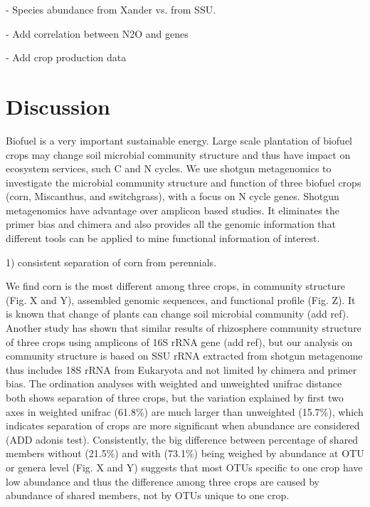 \documentclass[12pt]{article}
\begin{document}
- Species abundance from Xander vs. from SSU.

- Add correlation between N2O and genes

- Add crop production data

\section{Discussion}

Biofuel is a very important sustainable energy. Large scale plantation of biofuel crops may change soil microbial community structure and thus have impact on ecosystem services, such C and N cycles. We use shotgun metagenomics to investigate the microbial community structure and function of three biofuel crops (corn, Miscanthus, and switchgrass), with a focus on N cycle genes. Shotgun metagenomics have advantage over amplicon based studies. It eliminates the primer bias and chimera and also provides all the genomic information that different tools can be applied to mine functional information of interest.

1) consistent separation of corn from perennials.

We find corn is the most different among three crops, in community structure (Fig. X and Y), assembled genomic sequences, and functional profile (Fig. Z). It is known that change of plants can change soil microbial community (add ref). Another study has shown that similar results of rhizosphere community structure of three crops using amplicons of 16S rRNA gene (add ref), but our analysis on community structure is based on SSU rRNA extracted from shotgun metagenome thus includes 18S rRNA from Eukaryota and not limited by chimera and primer bias. The ordination analyses with weighted and unweighted unifrac distance both shows separation of three crops, but the variation explained by first two axes in weighted unifrac (61.8\%) are much larger than unweighted (15.7\%), which indicates separation of crops are more significant when abundance are considered (ADD adonis test). Consistently, the big difference between percentage of shared members without (21.5\%) and with (73.1\%) being weighed by abundance at OTU or genera level (Fig. X and Y) suggests that most OTUs specific to one crop have low abundance and thus the difference among three crops are caused by abundance of shared members, not by OTUs unique to one crop. 
\end{document}
